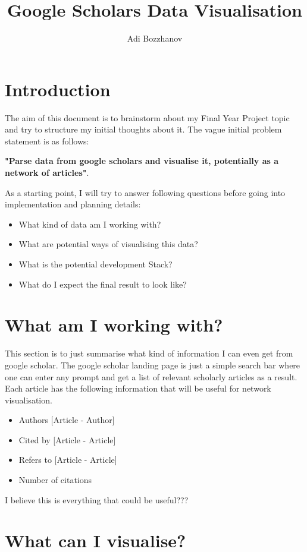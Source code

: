 \documentclass[12pt]{article}
\title{Google Scholars Data Visualisation}
\author{Adi Bozzhanov}
\begin{document}
\maketitle

\section{Introduction}

The aim of this document is to brainstorm about my Final Year Project topic
and try to structure my initial thoughts about it. The vague initial problem statement is as follows:

\textbf{"Parse data from google scholars and visualise it, potentially as a network of articles"}.

As a starting point, I will try to answer following questions before going into implementation
and planning details:


\begin{itemize}
\item What kind of data am I working with?
\item What are potential ways of visualising this data?
\item What is the potential development Stack?
\item What do I expect the final result to look like?
\end{itemize}

\section{What am I working with?}

This section is to just summarise what kind of information I can even get from google scholar.
The google scholar landing page is just a simple search bar where one can enter any prompt
and get a list of relevant scholarly articles as a result. Each article has the following
information that will be useful for network visualisation.

\begin{itemize}
\item Authors [Article - Author]
\item Cited by [Article - Article]
\item Refers to [Article - Article]
\item Number of citations
\end{itemize}

I believe this is everything that could be useful???
\section{What can I visualise?}
\end{document}
